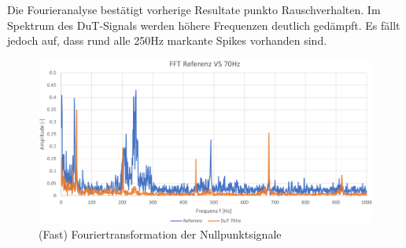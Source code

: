 \documentclass[12pt,a4paper]{article}
\begin{document}
\noindent Die Fourieranalyse bestätigt vorherige Resultate punkto Rauschverhalten. Im Spektrum des DuT-Signals werden höhere Frequenzen deutlich gedämpft. Es fällt jedoch auf, dass rund alle 250Hz markante Spikes vorhanden sind.
	\begin{figure}[H]
		\centering
		\includegraphics[width=1\linewidth]{img_70Hz/comp_FFT}
		\caption{(Fast) Fouriertransformation der Nullpunktsignale}
		\label{fig:compfft}
	\end{figure}
	
\end{document}
